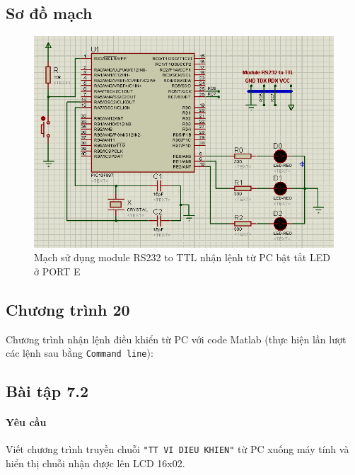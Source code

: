 \subsection*{Sơ đồ mạch}
\begin{figure}[!h]
\begin{center}
\includegraphics[scale=0.6]{bai-7/image/BAI-7-1}
\end{center}
\caption{Mạch sử dụng module RS232 to TTL nhận lệnh từ PC bật tắt LED ở PORT E}
\end{figure}
\subsection*{Chương trình 20}


Chương trình nhận lệnh điều khiển từ PC với code Matlab (thực hiện lần lượt các lệnh sau bằng \verb|Command line|):

\subsection{Bài tập 7.2}
\paragraph{Yêu cầu}Viết chương trình truyền chuỗi \verb|"TT VI DIEU KHIEN"| từ PC xuống máy tính và hiển thị chuỗi nhận được lên LCD 16x02.
